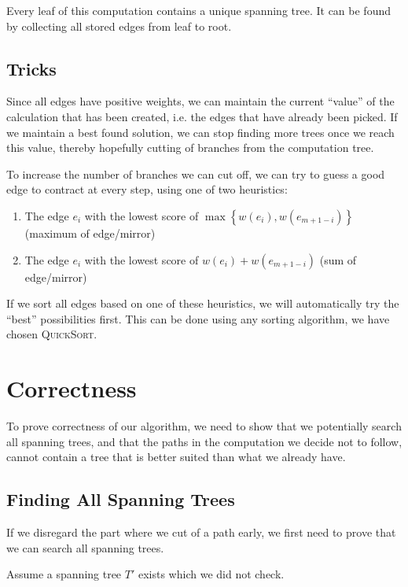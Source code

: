 
Every leaf of this computation contains a unique spanning tree. It can be found by collecting all stored edges from leaf to root.

\subsection{Tricks}
Since all edges have positive weights, we can maintain the current ``value'' of the calculation that has been created, i.e. the edges that have already been picked. If we maintain a best found solution, we can stop finding more trees once we reach this value, thereby hopefully cutting of branches from the computation tree.

To increase the number of branches we can cut off, we can try to guess a good edge to contract at every step, using one of two heuristics:

\begin{enumerate}
\item The edge $e_i$ with the lowest score of $\max\left\{w(e_i),w(e_{m+1-i})\right\}$ (maximum of edge/mirror)

\item The edge $e_i$ with the lowest score of $w(e_i)+w(e_{m+1-i})$ (sum of edge/mirror)
\end{enumerate}

If we sort all edges based on one of these heuristics, we will automatically try the ``best'' possibilities first. This can be done using any sorting algorithm, we have chosen \textsc{QuickSort}.

\section{Correctness}
To prove correctness of our algorithm, we need to show that we potentially search all spanning trees, and that the paths in the computation we decide not to follow, cannot contain a tree that is better suited than what we already have.

\subsection{Finding All Spanning Trees}

If we disregard the part where we cut of a path early, we first need to prove that we can search all spanning trees.

\noindent
Assume a spanning tree $T'$ exists which we did not check.

